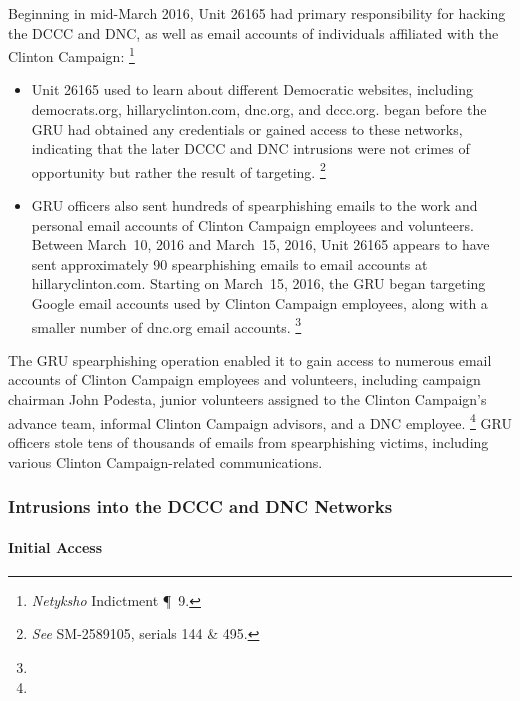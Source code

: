 Beginning in mid-March 2016, Unit 26165 had primary responsibility for hacking the DCCC and DNC, as well as email accounts of individuals affiliated with the Clinton Campaign:%
\footnote{\textit{Netyksho} Indictment \P~9.}

\begin{itemize}
    \item Unit 26165 used  to learn about  different Democratic websites, including democrats.org, hillaryclinton.com, dnc.org, and dccc.org.
     began before the GRU had obtained any credentials or gained access to these networks,  indicating that the later DCCC and DNC intrusions were not crimes of opportunity but rather the result of targeting.%
    \footnote{\textit{See} SM-2589105, serials 144 \& 495.}
    \item GRU officers also sent hundreds of spearphishing emails to the work and personal email accounts of Clinton Campaign employees and volunteers.
    Between March~10, 2016 and March~15, 2016, Unit 26165 appears to have sent approximately 90 spearphishing emails to email accounts at hillaryclinton.com.
    Starting on March~15, 2016, the GRU began targeting Google email accounts used by Clinton Campaign employees, along with a smaller number of dnc.org email accounts.%
    \footnote{}
\end{itemize}

The GRU spearphishing operation enabled it to gain access to numerous email accounts of Clinton Campaign employees and volunteers, including campaign chairman John Podesta, junior volunteers assigned to the Clinton Campaign's advance team, informal Clinton Campaign advisors, and a DNC employee.%
\footnote{}
GRU officers stole tens of thousands of emails from spearphishing victims, including various Clinton Campaign-related communications.

\subsubsection{Intrusions into the DCCC and DNC Networks}

\paragraph{Initial Access}

